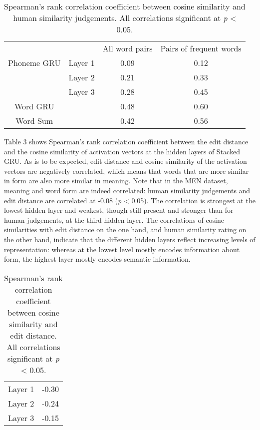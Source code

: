 \begin{table}[]
	\centering
	\begin{tabular}{cccc}
		&& All word pairs & Pairs of frequent words \\
		{\sc Phoneme GRU} & Layer 1 & 0.09 & 0.12\\
		& Layer 2 & 0.21 & 0.33 \\
		& Layer 3 & 0.28 & 0.45 \\
		\hline
		{\sc Word GRU} & & 0.48 & 0.60\\
		\hline
		{\sc Word Sum} & & 0.42 & 0.56
	\end{tabular}
	\caption{Spearman's rank correlation coefficient between cosine similarity and human similarity judgements. All correlations significant at \textit{p} < 0.05.} %
\end{table}

Table 3 shows Spearman's rank correlation coefficient between the edit distance and the cosine similarity of activation vectors at the hidden layers of {\sc Stacked GRU}.
As is to be expected, edit distance and cosine similarity of the activation vectors are negatively correlated, which means that words that are more similar in form are also more similar in meaning. Note that in the MEN dataset, meaning and word form are indeed correlated: human similarity judgements and edit distance are correlated at -0.08 (\textit{p} < 0.05). The correlation is strongest at the lowest hidden layer and weakest, though still present and stronger than for human judgements, at the third hidden layer. 
The correlations of cosine similarities with edit distance on the one hand, and human similarity rating on the other hand, indicate that the different hidden layers reflect increasing levels of representation: whereas at the lowest level mostly encodes information about form, the highest layer mostly encodes semantic information.

\begin{table}[]
	\centering
	\begin{tabular}{cc}
		Layer 1 & -0.30 \\
		Layer 2 & -0.24 \\
		Layer 3 & -0.15
	\end{tabular}
	\caption{Spearman's rank correlation coefficient between cosine similarity and edit distance. All correlations significant at \textit{p} < 0.05.} %
\end{table}

